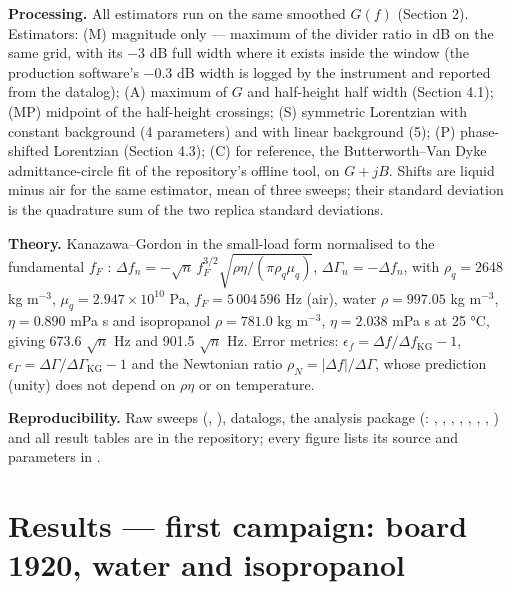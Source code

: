 \documentclass[11pt,a4paper]{article}
\begin{document}
\textbf{Processing.} All estimators run on the same smoothed \(G(f)\)
(Section 2). Estimators: (M) magnitude only --- maximum of the divider
ratio in dB on the same grid, with its −3 dB full width where it exists
inside the window (the production software's −0.3 dB width is logged by
the instrument and reported from the datalog); (A) maximum of \(G\) and
half-height half width (Section 4.1); (MP) midpoint of the half-height
crossings; (S) symmetric Lorentzian with constant background (4
parameters) and with linear background (5); (P) phase-shifted Lorentzian
(Section 4.3); (C) for reference, the Butterworth--Van Dyke
admittance-circle fit of the repository's offline tool, on \(G + jB\).
Shifts are liquid minus air for the same estimator, mean of three
sweeps; their standard deviation is the quadrature sum of the two
replica standard deviations.

\textbf{Theory.} Kanazawa--Gordon in the small-load form normalised to
the fundamental \(f_F\) \citep{KanazawaGordon1985AC, Johannsmann2021}:
\(\Delta f_n = -\sqrt{n}\,f_F^{3/2}\sqrt{\rho\eta/(\pi\rho_q\mu_q)}\),
\(\Delta\Gamma_n = -\Delta f_n\), with \(\rho_q = 2648\) kg m\(^{-3}\),
\(\mu_q = 2.947\times10^{10}\) Pa, \(f_F = 5\,004\,596\) Hz (air), water
\(\rho = 997.05\) kg m\(^{-3}\), \(\eta = 0.890\) mPa s and isopropanol
\(\rho = 781.0\) kg m\(^{-3}\), \(\eta = 2.038\) mPa s at 25 °C, giving
673.6 \(\sqrt n\) Hz and 901.5 \(\sqrt n\) Hz. Error metrics:
\(\epsilon_f = \Delta f/\Delta f_\mathrm{KG} - 1\),
\(\epsilon_\Gamma = \Delta\Gamma/\Delta\Gamma_\mathrm{KG} - 1\) and the
Newtonian ratio \(\rho_N = |\Delta f|/\Delta\Gamma\), whose prediction
(unity) does not depend on \(\rho\eta\) or on temperature.

\textbf{Reproducibility.} Raw sweeps
(,
),
datalogs, the analysis package (:
, ,
, ,
, ,
, ) and all result
tables are in the repository; every figure lists its source and
parameters in .

\hypertarget{results-first-campaign-board-1920-water-and-isopropanol}{%
\section{Results --- first campaign: board 1920, water and
isopropanol}\label{results-first-campaign-board-1920-water-and-isopropanol}}
\end{document}
